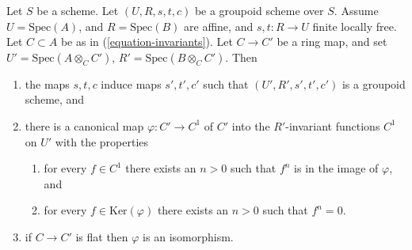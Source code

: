 \begin{lemma}
\label{lemma-invariants-base-change}
Let $S$ be a scheme. Let $(U, R, s, t, c)$ be a groupoid scheme over $S$.
Assume $U = \text{Spec}(A)$, and $R = \text{Spec}(B)$ are affine, and
$s, t : R \to U$ finite locally free. Let $C \subset A$ be as in
(\ref{equation-invariants}). Let $C \to C'$ be a ring map, and set
$U' = \text{Spec}(A \otimes_C C')$,
$R' = \text{Spec}(B \otimes_C C')$.
Then
\begin{enumerate}
\item the maps $s,t,c$ induce maps $s', t', c'$ such that
$(U', R', s', t', c')$ is a groupoid scheme, and
\item there is a canonical map $\varphi : C' \to C^1$ of $C'$ into
the $R'$-invariant functions $C^1$ on $U'$ with the properties
\begin{enumerate}
\item for every $f \in C^1$ there exists an $n > 0$ such that
$f^n$ is in the image of $\varphi$, and
\item for every $f \in \text{Ker}(\varphi)$ there exists
an $n > 0$ such that $f^n = 0$.
\end{enumerate}
\item if $C \to C'$ is flat then $\varphi$ is an isomorphism.
\end{enumerate}
\end{lemma}

